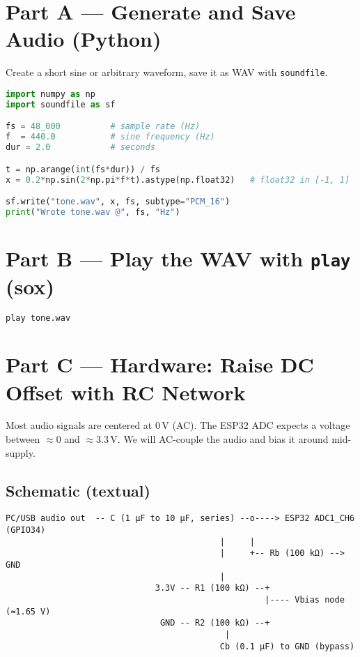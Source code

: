 \documentclass[11pt]{article}
\begin{document}
\section*{Part A — Generate and Save Audio (Python)}
Create a short sine or arbitrary waveform, save it as WAV with \texttt{soundfile}.
\begin{lstlisting}[language=Python, caption={Minimal NumPy + soundfile WAV writer}]
import numpy as np
import soundfile as sf

fs = 48_000          # sample rate (Hz)
f  = 440.0           # sine frequency (Hz)
dur = 2.0            # seconds

t = np.arange(int(fs*dur)) / fs
x = 0.2*np.sin(2*np.pi*f*t).astype(np.float32)   # float32 in [-1, 1]

sf.write("tone.wav", x, fs, subtype="PCM_16")
print("Wrote tone.wav @", fs, "Hz")
\end{lstlisting}

\section*{Part B — Play the WAV with \texttt{play} (sox)}
\begin{lstlisting}[language=bash, caption={Listen to your file}]
play tone.wav
\end{lstlisting}

\section*{Part C — Hardware: Raise DC Offset with RC Network}
Most audio signals are centered at 0\,V (AC). The ESP32 ADC expects a voltage between \(\approx 0\) and \(\approx 3.3\,\text{V}\). We will AC-couple the audio and bias it around mid-supply.

\subsection*{Schematic (textual)}
\begin{verbatim}
PC/USB audio out  -- C (1 µF to 10 µF, series) --o----> ESP32 ADC1_CH6 (GPIO34)
                                           |     |
                                           |     +-- Rb (100 kΩ) --> GND
                                           |
                              3.3V -- R1 (100 kΩ) --+
                                                    |---- Vbias node (≈1.65 V)
                               GND -- R2 (100 kΩ) --+
                                            |
                                           Cb (0.1 µF) to GND (bypass)
\end{verbatim}
\end{document}
